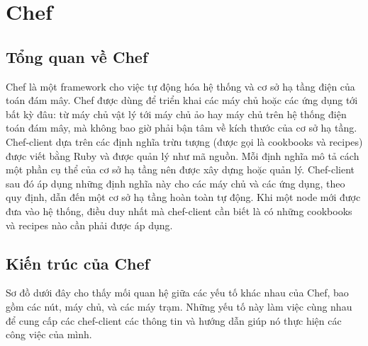 \section{Chef}

\subsection{Tổng quan về Chef}
Chef là một framework cho việc tự động hóa hệ thống và cơ sở hạ tầng điện của toán đám mây. Chef được dùng để triển khai các máy chủ hoặc các ứng dụng tới bất kỳ đâu: từ máy chủ vật lý tới máy chủ ảo hay máy chủ trên hệ thống điện toán đám mây, mà không bao giờ phải bận tâm về kích thước của cơ sở hạ tầng. Chef-client dựa trên các định nghĩa trừu tượng (được gọi là cookbooks và recipes) được viết bằng Ruby và được quản lý như mã nguồn. Mỗi định nghĩa mô tả cách một phần cụ thể của cơ sở hạ tầng nên được xây dựng hoặc quản lý. Chef-client sau đó áp dụng những định nghĩa này cho các máy chủ và các ứng dụng, theo quy định, dẫn đến một cơ sở hạ tầng hoàn toàn tự động. Khi một node mới được đưa vào hệ thống, điều duy nhất mà chef-client cần biết là có những cookbooks và recipes nào cần phải được áp dụng.

\subsection{Kiến trúc của Chef}

Sơ đồ dưới đây cho thấy mối quan hệ giữa các yếu tố khác nhau của Chef, bao gồm các nút, máy chủ, và các máy trạm. Những yếu tố này làm việc cùng nhau để cung cấp các chef-client các thông tin và hướng dẫn giúp nó thực hiện các công việc của mình.

\newpage
\clearpage

